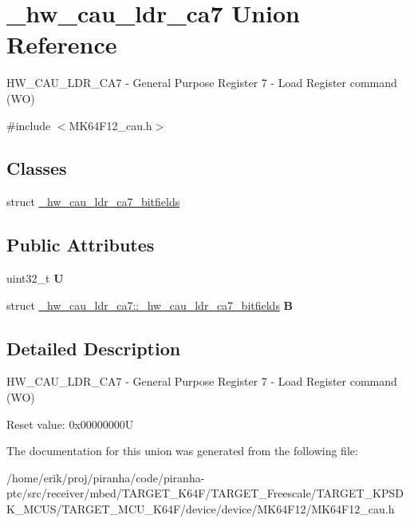 \hypertarget{union__hw__cau__ldr__ca7}{}\section{\+\_\+hw\+\_\+cau\+\_\+ldr\+\_\+ca7 Union Reference}
\label{union__hw__cau__ldr__ca7}


H\+W\+\_\+\+C\+A\+U\+\_\+\+L\+D\+R\+\_\+\+C\+A7 -\/ General Purpose Register 7 -\/ Load Register command (WO)  




{\ttfamily \#include $<$M\+K64\+F12\+\_\+cau.\+h$>$}

\subsection*{Classes}
\begin{DoxyCompactItemize}
\item 
struct \hyperlink{struct__hw__cau__ldr__ca7_1_1__hw__cau__ldr__ca7__bitfields}{\+\_\+hw\+\_\+cau\+\_\+ldr\+\_\+ca7\+\_\+bitfields}
\end{DoxyCompactItemize}
\subsection*{Public Attributes}
\begin{DoxyCompactItemize}
\item 
uint32\+\_\+t {\bfseries U}\hypertarget{union__hw__cau__ldr__ca7_a076b84cbc32ff1449c229c886fc1b929}{}\label{union__hw__cau__ldr__ca7_a076b84cbc32ff1449c229c886fc1b929}

\item 
struct \hyperlink{struct__hw__cau__ldr__ca7_1_1__hw__cau__ldr__ca7__bitfields}{\+\_\+hw\+\_\+cau\+\_\+ldr\+\_\+ca7\+::\+\_\+hw\+\_\+cau\+\_\+ldr\+\_\+ca7\+\_\+bitfields} {\bfseries B}\hypertarget{union__hw__cau__ldr__ca7_a9ede9f2ce7dbb483c1145b662deeda8a}{}\label{union__hw__cau__ldr__ca7_a9ede9f2ce7dbb483c1145b662deeda8a}

\end{DoxyCompactItemize}


\subsection{Detailed Description}
H\+W\+\_\+\+C\+A\+U\+\_\+\+L\+D\+R\+\_\+\+C\+A7 -\/ General Purpose Register 7 -\/ Load Register command (WO) 

Reset value\+: 0x00000000U 

The documentation for this union was generated from the following file\+:\begin{DoxyCompactItemize}
\item 
/home/erik/proj/piranha/code/piranha-\/ptc/src/receiver/mbed/\+T\+A\+R\+G\+E\+T\+\_\+\+K64\+F/\+T\+A\+R\+G\+E\+T\+\_\+\+Freescale/\+T\+A\+R\+G\+E\+T\+\_\+\+K\+P\+S\+D\+K\+\_\+\+M\+C\+U\+S/\+T\+A\+R\+G\+E\+T\+\_\+\+M\+C\+U\+\_\+\+K64\+F/device/device/\+M\+K64\+F12/M\+K64\+F12\+\_\+cau.\+h\end{DoxyCompactItemize}
